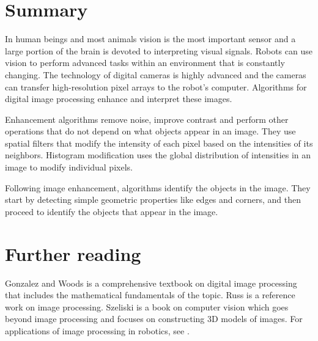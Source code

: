 \begin{figure}
\subfigures
\begin{minipage}{\textwidth}
\hspace{\fill}
\label{fig.door}
\label{fig.not-a-door}
\end{minipage}
\end{figure}

\section{Summary}

In human beings and most animals vision is the most important sensor and a large portion of the brain is devoted to interpreting visual signals. Robots can use vision to perform advanced tasks within an environment that is constantly changing. The technology of digital cameras is highly advanced and the cameras can transfer high-resolution pixel arrays to the robot's computer. Algorithms for digital image processing enhance and interpret these images.

Enhancement algorithms remove noise, improve contrast and perform other operations that do not depend on what objects appear in an image. They use spatial filters that modify the intensity of each pixel based on the intensities of its neighbors. Histogram modification uses the global distribution of intensities in an image to modify individual pixels.

Following image enhancement, algorithms identify the objects in the image. They start by detecting simple geometric properties like edges and corners, and then proceed to identify the objects that appear in the image.

\section{Further reading}

Gonzalez and Woods \cite{GW} is a comprehensive textbook on digital image processing that includes the mathematical fundamentals of the topic. Russ \cite{russ} is a reference work on image processing. Szeliski \cite{szeliski} is a book on computer vision which goes beyond image processing and focuses on constructing 3D models of images. For applications of image processing in robotics, see \cite[Chapter~4]{siegwart}.



